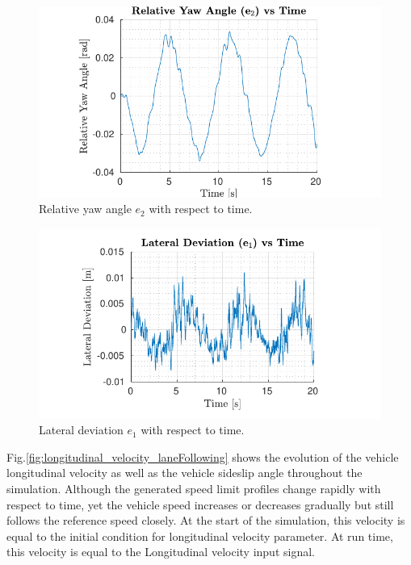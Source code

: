 \documentclass[conference, 11pt]{IEEEtran}
\begin{document}
\begin{figure}[!h]
	\centering
	\hspace*{-0.5in}
	\includegraphics[width=1.29\columnwidth]{../../MATLAB/lane_following/figure/RelativeYawAngleVsTime.pdf}
	\caption{Relative yaw angle $e_2$ with respect to time.}
	\label{fig:relative_yaw_angle_laneFollowing}
\end{figure}
\begin{figure}[!h]
	\centering
	\hspace*{-0.5in}
	\includegraphics[width=1.29\columnwidth]{../../MATLAB/lane_following/figure/LateralDeviationVsTime.pdf}
	\caption{Lateral deviation $e_1$ with respect to time.}
	\label{fig:lateral_deviation_laneFollowing}
\end{figure}
Fig.{\ref{fig:longitudinal_velocity_laneFollowing}} shows the evolution of the vehicle longitudinal velocity as well as the vehicle sideslip angle throughout the simulation. Although the generated speed limit profiles change rapidly with respect to time, yet the vehicle speed increases or decreases gradually but still follows the reference speed closely. At the start of the simulation, this velocity is equal to the initial condition for longitudinal velocity parameter. At run time, this velocity is equal to the Longitudinal velocity input signal.
\end{document}
